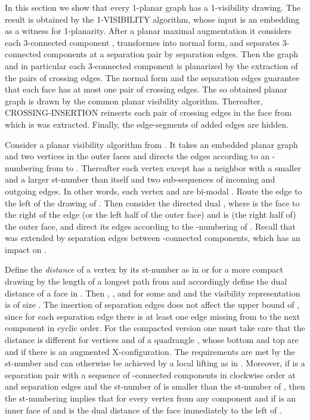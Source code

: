 \documentclass[runningheads]{llncs}
\begin{document}
In this section we show that every 1-planar graph has a 1-visibility
drawing. The result is obtained by the 1-VISIBILITY algorithm, whose
input is an embedding  as a witness for 1-planarity.
After a planar maximal augmentation it considers each 3-connected
component , transformes  into normal form, and separates
3-connected components at a separation pair by separation edges.
Then the graph and in particular each 3-connected component is
planarized by the extraction of the pairs of crossing edges. The
normal form and the separation edges guarantee that each face has at
most one pair of crossing edges. The so obtained planar graph is
drawn by the common planar visibility algorithm. Thereafter,
CROSSING-INSERTION  reinserts each pair of crossing edges in the
face from which is was extracted. Finally, the edge-segments of
added edges are hidden.


\iffalse
 Each separating pair  sandwiches the visibility
representations of the 3-connected components 
attached to   between the vertex-segments of  and ,
and the components are placed left to right and are separated by the
separation edges. The sandwich comes from the st-numbering and the
left-to-right ordering from the -numbering of the dual
graph.

\fi


Consider a  planar visibility algorithm  from
\cite{dett-gdavg-99,rt-rplbopg-86, TT-vrpg-86}.  It  takes an
embedded planar graph and two vertices  in the outer faces and
directs the edges according to an -numbering from  to .
Thereafter each vertex  except  has a neighbor with a
smaller and a larger st-number than itself and two sub-sequences of
incoming and outgoing edges. In other words, each vertex and  are
bi-modal \cite{rt-rplbopg-86}. Route the edge  to the left of
the drawing of . Then consider the directed dual , where
 is the face to the right of the  edge (or the left half
of the outer face) and  is (the right half of) the outer face,
and direct its edges according to the -numbering of .
Recall that  was extended by separation edges between
-connected components, which has an impact on .


Define the  \emph{distance}  of a vertex  by its
st-number as in \cite{rt-rplbopg-86, TT-vrpg-86} or for a more
compact drawing \cite{dett-gdavg-99} by the length of a longest path
from  and accordingly define the dual distance  of a
face  in .  Then , ,
 and  for some  and
 and the visibility representation is of size . The insertion of separation edges does not affect the upper
bound of , since for each separation edge  there is at
least one edge missing from  to the next component  in
cyclic order. For the compacted version one must take care that the
distance is different for vertices  and  of a quadrangle , whose bottom and top are  and  if there is an
augmented X-configuration. The  requirements are met by the
st-number and can otherwise be achieved by a local lifting as in
\cite{b-sdogs-11}. Moreover, if  is a separation pair with
a sequence of -connected components  in
clockwise order at  and separation edges  and
the st-number of  is smaller than the st-number of , then the
st-numbering implies that  for
every vertex  from any component  and  if  is an inner face of 
and  is the dual distance of the face immediately to
the left of .
\end{document}
